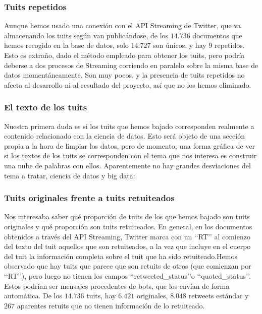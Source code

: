 \subsubsection{Tuits repetidos}
Aunque hemos usado una conexión con el API Streaming de Twitter, que va almacenando los
tuits según van publicándose,  de los $14.736$ documentos que hemos recogido en la base de datos, 
solo $14.727$ son únicos, y hay $9$ repetidos. Esto es extraño, dado el método empleado para obtener
los tuits, pero podría deberse a dos procesos de Streaming corriendo en paralelo sobre la misma base de datos momentáneamente. Son muy pocos, y la presencia de tuits repetidos no afecta al desarrollo ni al
resultado del proyecto, así que no los hemos eliminado.

\subsubsection{El texto de los tuits}
Nuestra primera duda es si los tuits que hemos bajado corresponden realmente a contenido relacionado
con la ciencia de datos. Esto será objeto de una sección propia a la hora de limpiar los datos,
pero de momento, una forma gráfica de ver si los textos de los tuits se corresponden con el tema
que nos interesa es construir una nube de palabras con ellos. 
Aparentemente no hay grandes desviaciones del tema a tratar, ciencia de datos y big data:




\subsubsection{Tuits originales frente a tuits retuiteados}
Nos interesaba saber qué proporción de tuits de los que hemos bajado son tuits originales
y qué proporción son tuits retuiteados. En general, en los documentos obtenidos a través
del API Streaming, Twitter marca con un \lq\lq RT\rq\rq
al comienzo del texto del tuit aquellos que son retuiteados, a la vez que incluye en el cuerpo del
tuit la información completa sobre el tuit que ha sido retuiteado.Hemos observado
que hay tuits que parece que son retuits de otros (que comienzan por  \lq\lq RT\rq\rq), pero luego
no tienen los campos \lq\lq retweeted\_status\rq\rq o \lq\lq quoted\_status\rq\rq. Estos podrían ser 
mensajes procedentes de bots, que los envían de forma automática. De los $14.736$ tuits,  hay 
$6.421$ originales, $8.048$ retweets estándar y $267$ aparentes retuits que no tienen información
de lo retuiteado.

